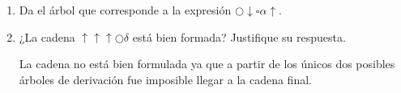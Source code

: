 \documentclass[10pt,letterpaper]{article}
\begin{document}
\begin{enumerate}
\begin{enumerate}
            \item Da el árbol que corresponde a la expresión $\bigcirc \downarrow \square \alpha \uparrow$.
                \begin{center}
                \end{center}

            \clearpage
            \item ¿La cadena $\uparrow \uparrow \uparrow \bigcirc \delta$ está bien formada?
                  Justifique su respuesta.
                \begin{multicols}{2}
                    \begin{center}
                    \end{center}
                    \begin{center}
                    \end{center}
                \end{multicols}
                La cadena no está bien formulada ya que a partir de los únicos dos posibles
                árboles de derivación fue imposible llegar a la cadena final.
        \end{enumerate}
\end{enumerate}
\end{document}
